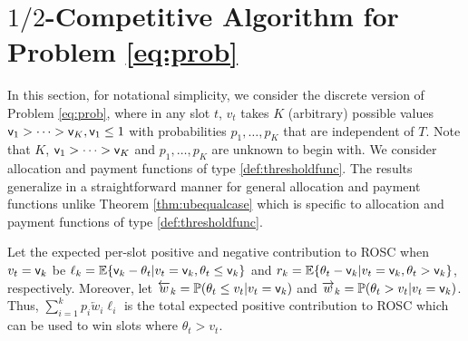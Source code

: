 



\section{$1/2$-Competitive Algorithm for Problem \ref{eq:prob}}\label{sec:competitive}
In this section, for notational simplicity, we consider the discrete version of Problem \ref{eq:prob}, where in any slot $t$, $v_t$ takes $K$ (arbitrary) possible values ${\mathsf{v}}_1 > \dots > {\mathsf{v}}_K, {\mathsf{v}}_1\le 1$ with probabilities $p_1, \dots, p_K$ that are independent of $T$. Note that $K$, ${\mathsf{v}}_1 > \dots > {\mathsf{v}}_K$ and $p_1, \dots, p_K$ are unknown to begin with. We consider allocation and payment functions 
of type \eqref{def:thresholdfunc}. The results generalize in a straightforward manner for general allocation and payment functions unlike Theorem \ref{thm:ubequalcase} which is specific to allocation and payment functions 
of type \eqref{def:thresholdfunc}.

Let the expected per-slot positive and negative  contribution to ROSC when $v_t={\mathsf{v}}_k$ be 
$\ell_k = {\mathbb{E}}\{{\mathsf{v}}_k - \theta_t|v_t={\mathsf{v}}_k,  \theta_t\le {\mathsf{v}}_k\}$ and $r_k = {\mathbb{E}}\{ \theta_t-{\mathsf{v}}_k |v_t={\mathsf{v}}_k,  \theta_t> {\mathsf{v}}_k\}$, respectively. Moreover, let  
$\overleftarrow{w}_k = {\mathbb{P}}( \theta_t\le v_t|v_t= {\mathsf{v}}_k)$ and $\overrightarrow{w}_k = {\mathbb{P}}( \theta_t > v_t|v_t= {\mathsf{v}}_k)$. Thus, $\sum_{i=1}^k p_i\overleftarrow{w}_i \ell_i$ is the total expected positive contribution to ROSC which can be used to win slots where $\theta_t > v_t$.





